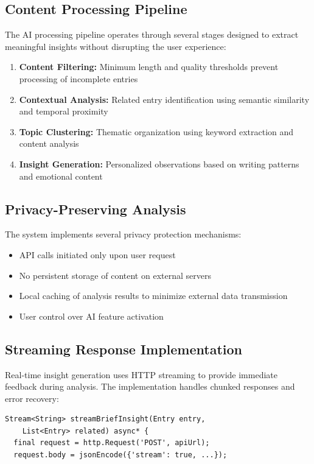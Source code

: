 \documentclass[conference]{IEEEtran}
\begin{document}
{\begin{IEEEkeywords}
\subsection{Content Processing Pipeline}

The AI processing pipeline operates through several stages designed to extract meaningful insights without disrupting the user experience:

\begin{enumerate}
\item \textbf{Content Filtering:} Minimum length and quality thresholds prevent processing of incomplete entries
\item \textbf{Contextual Analysis:} Related entry identification using semantic similarity and temporal proximity
\item \textbf{Topic Clustering:} Thematic organization using keyword extraction and content analysis
\item \textbf{Insight Generation:} Personalized observations based on writing patterns and emotional content
\end{enumerate}

\subsection{Privacy-Preserving Analysis}

The system implements several privacy protection mechanisms:
\begin{itemize}
\item API calls initiated only upon user request
\item No persistent storage of content on external servers
\item Local caching of analysis results to minimize external data transmission
\item User control over AI feature activation
\end{itemize}

\subsection{Streaming Response Implementation}

Real-time insight generation uses HTTP streaming to provide immediate feedback during analysis. The implementation handles chunked responses and error recovery:

\begin{verbatim}
Stream<String> streamBriefInsight(Entry entry, 
    List<Entry> related) async* {
  final request = http.Request('POST', apiUrl);
  request.body = jsonEncode({'stream': true, ...});
  

\end{verbatim}
\end{IEEEkeywords}}
\end{document}
